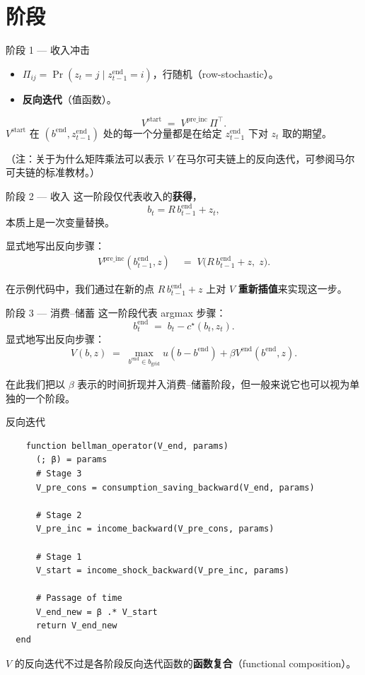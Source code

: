 \documentclass[10pt,aspectratio=169]{beamer}
\begin{document}
\section{阶段}

\begin{frame}{阶段 1 --- 收入冲击}
  \begin{itemize}
    \item $\Pi_{ij} = \Pr(z_t = j \mid z^{\mathrm{end}}_{t-1} = i)$，行随机（row-stochastic）。
    \item \textbf{反向迭代}（值函数）。
  \end{itemize}
  \[
    V^{\mathrm{start}} \;=\; V^{\mathrm{pre\_inc}} \, \Pi^\top.
  \]
  $V^{\mathrm{start}}$ 在 $(b^{\mathrm{end}}, z^{\mathrm{end}}_{t-1})$ 处的每一个分量都是在给定 $z^{\mathrm{end}}_{t-1}$ 下对 $z_t$ 取的期望。

  （注：关于为什么矩阵乘法可以表示 $V$ 在马尔可夫链上的反向迭代，可参阅马尔可夫链的标准教材。）
\end{frame}

\begin{frame}{阶段 2 --- 收入}
  这一阶段仅代表收入的\textbf{获得}，
  \[
    b_t = R \, b^{\mathrm{end}}_{t-1} + z_t,
  \]
  本质上是一次变量替换。

  显式地写出反向步骤：
  \begin{align*}
    V^{\mathrm{pre\_inc}}(b^{\mathrm{end}}_{t-1}, z)
    \; &= \; V\!\big(R\, b^{\mathrm{end}}_{t-1} + z,\; z\big).
  \end{align*}

  在示例代码中，我们通过在新的点 $R\, b^{\mathrm{end}}_{t-1} + z$ 上对 $V$ \textbf{重新插值}来实现这一步。
\end{frame}

\begin{frame}{阶段 3 --- 消费--储蓄}
  这一阶段代表 argmax 步骤：
  \[
    b^{\mathrm{end}}_t \;=\; b_t - c^\star(b_t, z_t).
  \]
  显式地写出反向步骤：
  \[
    V(b, z) \;=\; \max_{b^{\mathrm{end}} \in b_{\mathrm{grid}}} u(b - b^{\mathrm{end}}) + \beta V^{\mathrm{end}}(b^{\mathrm{end}}, z).
  \]

  在此我们把以 $\beta$ 表示的时间折现并入消费--储蓄阶段，但一般来说它也可以视为单独的一个阶段。
\end{frame}

\begin{frame}[fragile]{反向迭代}
  \begin{lstlisting}
    function bellman_operator(V_end, params)
      (; β) = params
      # Stage 3
      V_pre_cons = consumption_saving_backward(V_end, params)

      # Stage 2
      V_pre_inc = income_backward(V_pre_cons, params)

      # Stage 1
      V_start = income_shock_backward(V_pre_inc, params)

      # Passage of time
      V_end_new = β .* V_start
      return V_end_new
  end
  \end{lstlisting}
  $V$ 的反向迭代不过是各阶段反向迭代函数的\textbf{函数复合}（functional composition）。
\end{frame}
\end{document}
